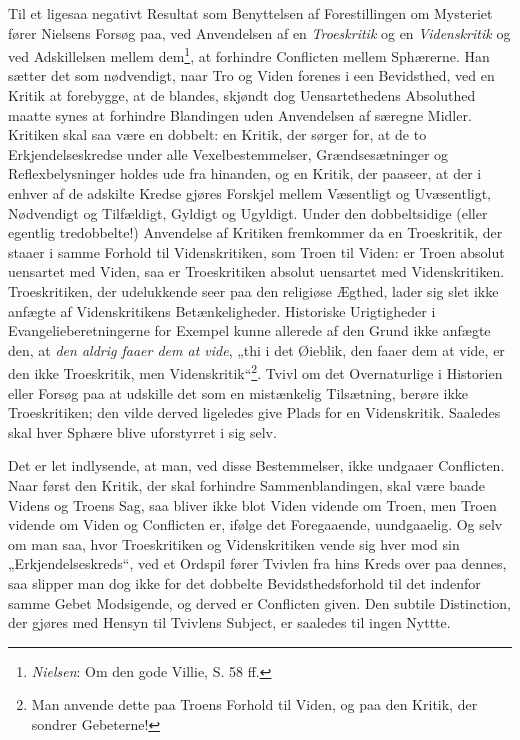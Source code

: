 \documentclass[12pt,a4paper]{book}
\newcommand{\opage}[1]{\marginnote{\footnotesize\textit{[#1]}}}
\begin{document}
Til et ligesaa negativt Resultat som Benyttelsen af Forestillingen om Mysteriet fører Nielsens
Forsøg paa, ved \opage{188}Anvendelsen af en \emph{Troeskritik} og en \emph{Videnskritik} og ved
Adskillelsen mellem dem\footnote{\emph{Nielsen}: Om den gode Villie, S. 58 ff.}, at forhindre
Conflicten mellem Sphærerne. Han sætter det som nødvendigt, naar Tro og Viden forenes i een
Bevidsthed, ved en Kritik at forebygge, at de blandes, skjøndt dog Uensartethedens Absoluthed
maatte synes at forhindre Blandingen uden Anvendelsen af særegne Midler. Kritiken skal saa
være en dobbelt: en Kritik, der sørger for, at de to Erkjendelseskredse under alle
Vexelbestemmelser, Grændsesætninger og Reflexbelysninger holdes ude fra hinanden, og en
Kritik, der paaseer, at der i enhver af de adskilte Kredse gjøres Forskjel mellem Væsentligt
og Uvæsentligt, Nødvendigt og Tilfældigt, Gyldigt og Ugyldigt. Under den dobbeltsidige (eller
egentlig tredobbelte!) Anvendelse af Kritiken fremkommer da en Troeskritik, der staaer i samme
Forhold til Videnskritiken, som Troen til Viden: er Troen absolut uensartet med Viden, saa er
Troeskritiken absolut uensartet med Videnskritiken. Troeskritiken, der udelukkende seer paa
den religiøse Ægthed, lader sig slet ikke anfægte af Videnskritikens Betænkeligheder.
Historiske Urigtigheder i Evangelieberetningerne for Exempel kunne allerede af den Grund ikke
anfægte den, at \emph{den aldrig faaer dem at vide}, „thi i det Øieblik, den faaer dem at vide, er den
ikke Troeskritik, men Videnskritik“\footnote{Man anvende dette paa Troens Forhold til Viden,
og paa den Kritik, der sondrer Gebeterne!}. Tvivl om det Overnaturlige i Historien eller
Forsøg paa at udskille det som en mistænkelig Tilsætning, berøre ikke Troeskritiken; den vilde
derved ligeledes give Plads for en Videnskritik. Saaledes skal hver Sphære blive uforstyrret i
sig selv.

Det er let indlysende, at man, ved disse Bestemmelser, ikke undgaaer Conflicten. Naar først
den Kritik, der skal forhindre Sammenblandingen, skal være baade Videns og Troens Sag, saa
bliver ikke blot Viden vidende om Troen, men Troen vidende om Viden og Conflicten er, ifølge
det \opage{189}Foregaaende, uundgaaelig. Og selv om man saa, hvor Troeskritiken og Videnskritiken vende
sig hver mod sin „Erkjendelseskreds“, ved et Ordspil fører Tvivlen fra hins Kreds over paa
dennes, saa slipper man dog ikke for det dobbelte Bevidsthedsforhold til det indenfor samme
Gebet Modsigende, og derved er Conflicten given. Den subtile Distinction, der gjøres med
Hensyn til Tvivlens Subject, er saaledes til ingen Nyttte.
\end{document}
